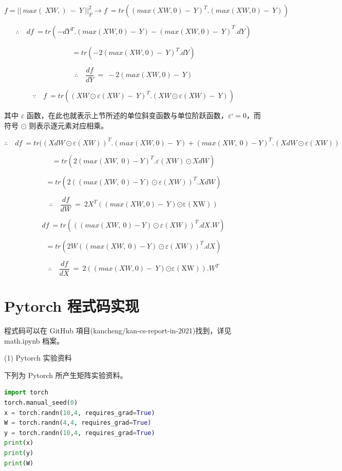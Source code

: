 \documentclass[11pt,UTF8]{ctexart}
\begin{document}
$$f={||\ max(\ XW,)\ -\ Y\ ||}_F^2 \rightarrow f\ =tr({(max(XW,0)-\ Y)}^T.(max(XW,0)-\ Y))$$


$$\therefore\quad df\ =tr({-{dY}^T.(max(XW,0)-\ Y)-(max(XW,0)-\ Y)}^T.dY)$$

$$=tr({-2(max(XW,0)-\ Y)}^T.dY)$$

$$\therefore\quad \frac{df}{dY}\ =\ -2(max(XW,0)-\ Y)$$

$$\because\quad  f\ =tr({(XW\odot\varepsilon(XW)-\ Y)}^T.(XW\odot\varepsilon(XW)-\ Y))$$

其中 $\varepsilon$ 函数，在此也就表示上节所述的单位斜变函数与单位阶跃函数，$\varepsilon‘= 0$，而符号 $\odot$ 则表示逐元素对应相乘。

$$\therefore\quad df\ =tr({(XdW\odot\varepsilon(XW))}^T.(max(XW,0)-\ Y)+{(max(XW,\ 0)-Y)}^T.(XdW\odot\varepsilon(XW))$$

$$=tr({2(max(XW,\ 0)-Y)}^T.\varepsilon(XW)\odot XdW)$$

$$=tr({2((max(XW,\ 0)-Y)\odot\varepsilon(XW))}^T.XdW)$$

$$\therefore\quad \frac{df}{dW}\ =\ 2X^T((max(XW,0)-\ Y)\mathrm{\odot\varepsilon(XW)})$$

$$df\ =tr({((max(XW,\ 0)-Y)\odot\varepsilon(XW))}^T.dX.W)$$

$$=tr(2W{((max(XW,\ 0)-Y)\odot\varepsilon(XW))}^T.dX)$$

$$\therefore\quad \frac{df}{dX}\ =\ 2((max(XW,0)-\ Y)\mathrm{\odot\varepsilon(XW)}).W^T$$

\newpage

\section{Pytorch 程式码实现}

程式码可以在 GitHub 項目(kancheng/kan-cs-report-in-2021)找到，详见 math.ipynb 档案。


(1) Pytorch 实验资料

下列为 Pytorch 所产生矩阵实验资料。
\newline

	\begin{lstlisting}[language={python}]
import torch
torch.manual_seed(0)
x = torch.randn(10,4, requires_grad=True)
W = torch.randn(4,4, requires_grad=True)
y = torch.randn(10,4, requires_grad=True)
print(x)
print(y)
print(W)
	\end{lstlisting}
	
\end{document}
